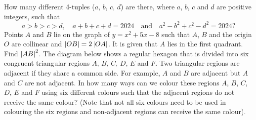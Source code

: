 \begin{enumerate}
    \begin{center}
    \end{center}
    \hyperrefitem[Q::2024-J-1-21] How many different 4-tuples ($a$, $b$, $c$, $d$) are there, where $a$, $b$, $c$ and $d$ are positive integers, such that \[a > b > c > d, \quad a + b + c + d = 2024 \quad \text{and} \quad a^2 - b^2 + c^2 - d^2 = 2024?\]
    \hyperrefitem[Q::2024-J-1-22] Points $A$ and $B$ lie on the graph of $y = x^2 + 5x - 8$ such that $A$, $B$ and the origin $O$ are collinear and $\left\lvert OB \right\rvert = 2\left\lvert OA \right\rvert$. It is given that $A$ lies in the first quadrant. Find $\left\lvert AB \right\rvert^2$.
    \hyperrefitem[Q::2024-J-1-23] The diagram below shows a regular hexagon that is divided into six congruent triangular regions $A$, $B$, $C$, $D$, $E$ and $F$. Two triangular regions are adjacent if they share a common side. For example, $A$ and $B$ are adjacent but $A$ and $C$ are not adjacent. In how many ways can we colour these regions $A$, $B$, $C$, $D$, $E$ and $F$ using six different colours such that the adjacent regions do not receive the same colour? (Note that not all six colours need to be used in colouring the six regions and non-adjacent regions can receive the same colour).

    \begin{center}
\end{center}
\end{enumerate}
